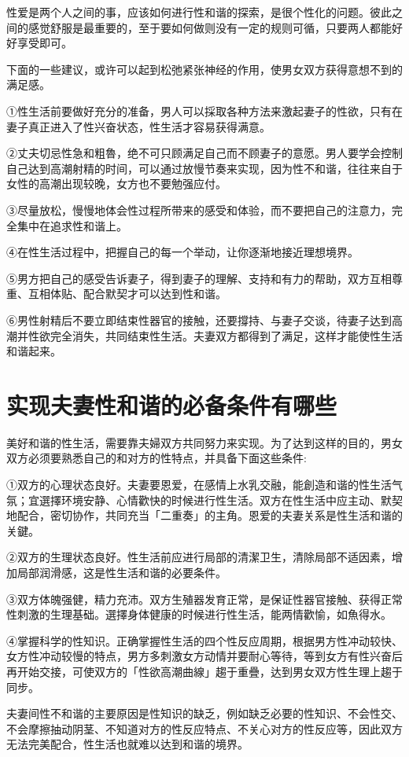 \documentclass[12pt,UTF8]{ctexbook}
\begin{document}
性爱是两个人之间的事，应该如何进行性和谐的探索，是很个性化的问题。彼此之间的感觉舒服是最重要的，至于要如何做则没有一定的规则可循，只要两人都能好好享受即可。

下面的一些建议，或许可以起到松弛紧张神经的作用，使男女双方获得意想不到的满足感。

①性生活前要做好充分的准备，男人可以採取各种方法来激起妻子的性欲，只有在妻子真正进入了性兴奋状态，性生活才容易获得满意。

②丈夫切忌性急和粗魯，绝不可只顾满足自己而不顾妻子的意愿。男人要学会控制自己达到高潮射精的时间，可以通过放慢节奏来实现，因为性不和谐，往往来自于女性的高潮出现较晚，女方也不要勉强应付。

③尽量放松，慢慢地体会性过程所带来的感受和体验，而不要把自己的注意力，完全集中在追求性和谐上。

④在性生活过程中，把握自己的每一个举动，让你逐渐地接近理想境界。

⑤男方把自己的感受告诉妻子，得到妻子的理解、支持和有力的帮助，双方互相尊重、互相体贴、配合默契才可以达到性和谐。

⑥男性射精后不要立即结束性器官的接触，还要撐持、与妻子交谈，待妻子达到高潮并性欲完全消失，共同结束性生活。夫妻双方都得到了满足，这样才能使性生活和谐起来。

\section{实现夫妻性和谐的必备条件有哪些}

美好和谐的性生活，需要靠夫婦双方共同努力来实现。为了达到这样的目的，男女双方必须要熟悉自己的和对方的性特点，并具备下面这些条件:

①双方的心理状态良好。夫妻要恩爱，在感情上水乳交融，能創造和谐的性生活气氛；宜選擇环境安静、心情歡快的时候进行性生活。双方在性生活中应主动、默契地配合，密切协作，共同充当「二重奏」的主角。恩爱的夫妻关系是性生活和谐的关鍵。

②双方的生理状态良好。性生活前应进行局部的清潔卫生，清除局部不适因素，增加局部润滑感，这是性生活和谐的必要条件。

③双方体魄强健，精力充沛。双方生殖器发育正常，是保证性器官接触、获得正常性刺激的生理基础。選擇身体健康的时候进行性生活，能两情歡愉，如魚得水。

④掌握科学的性知识。正确掌握性生活的四个性反应周期，根据男方性冲动较快、女方性冲动较慢的特点，男方多刺激女方动情并要耐心等待，等到女方有性兴奋后再开始交接，可使双方的「性欲高潮曲線」趨于重疊，达到男女双方性生理上趨于同步。

夫妻间性不和谐的主要原因是性知识的缺乏，例如缺乏必要的性知识、不会性交、不会摩擦抽动阴茎、不知道对方的性反应特点、不关心对方的性反应等，因此双方无法完美配合，性生活也就难以达到和谐的境界。
\end{document}
